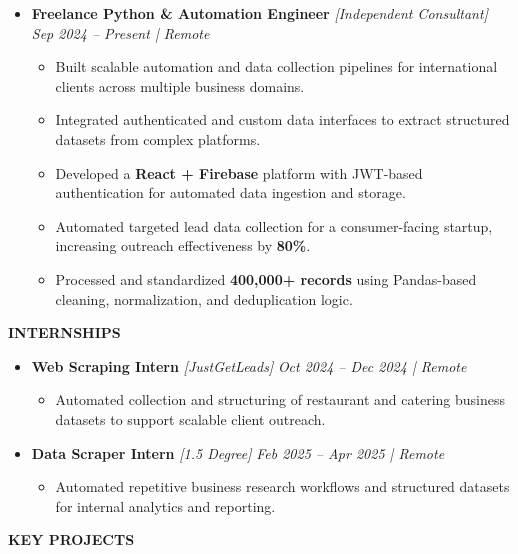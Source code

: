\documentclass[a4paper,10pt]{article}
\newcommand{\resheading}[1]{{\small \colorbox{mygrey}{\begin{minipage}{0.975\textwidth}{\textbf{#1}}\end{minipage}}}}
\begin{document}
\begin{itemize}

\item {\bf Freelance Python \& Automation Engineer}
\textit{[Independent Consultant]}
\textit{\hfill {Sep 2024 -- Present | Remote}}
\begin{itemize}
\item Built scalable automation and data collection pipelines
for international clients across multiple business domains.
\item Integrated authenticated and custom data interfaces
to extract structured datasets from complex platforms.
\item Developed a \textbf{React + Firebase} platform with
JWT-based authentication for automated data ingestion and storage.
\item Automated targeted lead data collection for a consumer-facing startup,
increasing outreach effectiveness by \textbf{80\%}.
\item Processed and standardized \textbf{400,000+ records}
using Pandas-based cleaning, normalization, and deduplication logic.
\end{itemize}

\end{itemize}

\resheading{\textbf{INTERNSHIPS}}

\begin{itemize}

\item {\bf Web Scraping Intern} \textit{[JustGetLeads]}
\textit{\hfill {Oct 2024 -- Dec 2024 | Remote}}
\begin{itemize}
\item Automated collection and structuring of restaurant and catering
business datasets to support scalable client outreach.
\end{itemize}

\item {\bf Data Scraper Intern} \textit{[1.5 Degree]}
\textit{\hfill {Feb 2025 -- Apr 2025 | Remote}}
\begin{itemize}
\item Automated repetitive business research workflows and
structured datasets for internal analytics and reporting.
\end{itemize}

\end{itemize}

\resheading{\textbf{KEY PROJECTS}}
\end{document}
